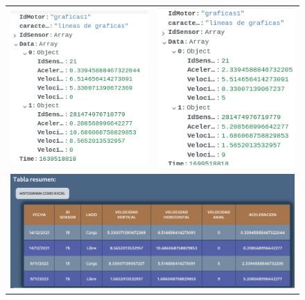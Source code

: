 \documentclass[12pt]{article}
\begin{document}
\begin{refsegment}
\begin{figure}[H]
\begin{tabular}{m{8cm}m{8cm}}
            \includegraphics[width=8cm]{comprobacion_resultados/finales/graficas1Mongo1.png}&
            \includegraphics[width=8cm]{comprobacion_resultados/finales/graficas1Mongo2.png}\\
            \multicolumn{2}{c}{\includegraphics[width=12cm]{comprobacion_resultados/finales/tablaGraficas1.png}}
        \end{tabular}
        \label{img:GraficasHistoricas}
    \end{figure}


\end{refsegment}
\end{document}
